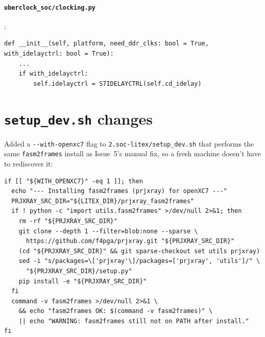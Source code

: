 \documentclass[11pt]{article}
\begin{document}
\paragraph{\texttt{uberclock\_soc/clocking.py}}:
\begin{lstlisting}[style=codeblk]
def __init__(self, platform, need_ddr_clks: bool = True, with_idelayctrl: bool = True):
    ...
    if with_idelayctrl:
        self.idelayctrl = S7IDELAYCTRL(self.cd_idelay)
\end{lstlisting}

\section{\texttt{setup\_dev.sh} changes}
\label{app:setupdev}

Added a \lstinline{--with-openxc7} flag to
\lstinline{2.soc-litex/setup_dev.sh} that performs the same
\lstinline{fasm2frames} install as Issue~5's manual fix, so a fresh
machine doesn't have to rediscover it:

\begin{lstlisting}[style=codeblk]
if [[ "${WITH_OPENXC7}" -eq 1 ]]; then
  echo "--- Installing fasm2frames (prjxray) for openXC7 ---"
  PRJXRAY_SRC_DIR="${LITEX_DIR}/prjxray_fasm2frames"
  if ! python -c "import utils.fasm2frames" >/dev/null 2>&1; then
    rm -rf "${PRJXRAY_SRC_DIR}"
    git clone --depth 1 --filter=blob:none --sparse \
      https://github.com/f4pga/prjxray.git "${PRJXRAY_SRC_DIR}"
    (cd "${PRJXRAY_SRC_DIR}" && git sparse-checkout set utils prjxray)
    sed -i "s/packages=\['prjxray'\]/packages=['prjxray', 'utils']/" \
      "${PRJXRAY_SRC_DIR}/setup.py"
    pip install -e "${PRJXRAY_SRC_DIR}"
  fi
  command -v fasm2frames >/dev/null 2>&1 \
    && echo "fasm2frames OK: $(command -v fasm2frames)" \
    || echo "WARNING: fasm2frames still not on PATH after install."
fi
\end{lstlisting}
\end{document}
